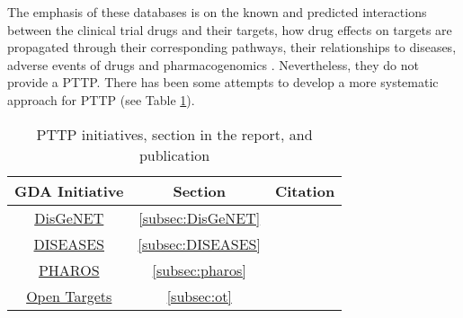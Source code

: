 \documentclass{article}
\begin{document}
The emphasis of these databases is on the known and predicted interactions between the clinical trial drugs and their targets, how drug effects on targets are propagated through their corresponding pathways, their relationships to diseases, adverse events of drugs and pharmacogenomics \cite{brown2018}. Nevertheless, they do not provide a PTTP. There has been some attempts to develop a more systematic approach for PTTP (see Table \ref{tab:related_work}).

\begin{table}[H]
\centering
    \begin{tabular}{c|c|c}
      GDA Initiative & Section & Citation \\
      \hline
      
      \href{https://goo.gl/ewnpWZ}{DisGeNET} & \ref{subsec:DisGeNET} & \cite{DisGeNET2015} \\
      
      \href{https://goo.gl/KGQsd9}{DISEASES} & \ref{subsec:DISEASES} & \cite{DISEASES2015} \\
      
      \href{https://goo.gl/dPWHNY}{PHAROS} &  \ref{subsec:pharos} & \cite{pharos2016} \\
      
      \href{https://goo.gl/eQ667p}{Open Targets} & \ref{subsec:ot} & \cite{koscielny2016} \\
      
      \end{tabular}
\caption{PTTP initiatives, section in the report, and publication \label{tab:related_work}}
\end{table}














% 

% 
\end{document}

